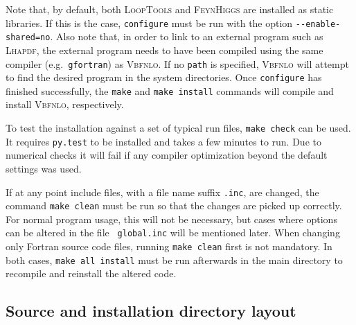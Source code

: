 \documentclass[english,12pt]{article}
\begin{document}
\begin{itemize}
\end{itemize}

Note that, by default, both \textsc{LoopTools} and \textsc{FeynHiggs} are
installed as static libraries.  If this is the case, {\tt configure} must be run
with the option {\tt -{}-enable-shared=no}.  Also note that, in order to link to
an external program such as \textsc{Lhapdf}, the external program needs to have
been compiled using the same compiler (e.g.\ {\tt gfortran}) as \textsc{Vbfnlo}.
If no {\tt path} is specified, \textsc{Vbfnlo} will attempt to find the desired
program in the system directories.  Once {\tt configure} has finished
successfully, the {\tt make} and {\tt make install} commands will compile and
install \textsc{Vbfnlo}, respectively.

To test the installation against a set of typical run files, {\tt make check} can be used.
It requires {\tt py.test} to be installed and takes a few minutes to run.
Due to numerical checks it will fail if any compiler optimization beyond the default
settings was used.

If at any point include files, with a file name suffix {\tt .inc}, are
changed, the command {\tt make clean} must be run so that the changes
are picked up correctly. For normal program usage, this will not be
necessary, but cases where options can be altered in the file {\tt
global.inc} will be mentioned later.
When changing only Fortran source code files, running {\tt make clean}
first is not mandatory. In both cases, {\tt make all install} must be
run afterwards in the main directory to recompile and reinstall the
altered code.



\subsection{Source and installation directory layout}
\end{document}
